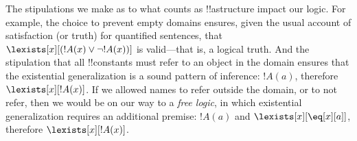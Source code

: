 \documentclass[../../../include/open-logic-section]{subfiles}
\begin{document}
\begin{digress}
The stipulations we make as to what counts as !!a{structure} impact
our logic. For example, the choice to prevent empty domains ensures,
given the usual account of satisfaction (or truth) for quantified
sentences, that $\lexists[x][(!A(x) \lor \lnot !A(x))]$ is
valid---that is, a logical truth. And the stipulation that all
!!{constant}s must refer to an object in the domain ensures that the
existential generalization is a sound pattern of inference: $!A(a)$,
therefore $\lexists[x][!A(x)]$. If we allowed names to refer outside
the domain, or to not refer, then we would be on our way to a
\emph{free logic}, in which existential generalization requires an
additional premise: $!A(a)$ and $\lexists[x][\eq[x][a]]$, therefore
$\lexists[x][!A(x)]$.
\end{digress}
\end{document}
